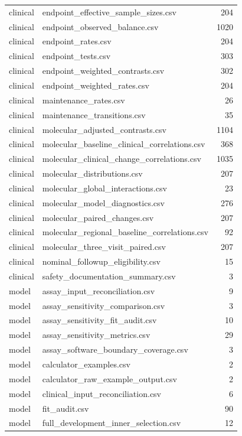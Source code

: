 \begin{longtable}{p{20mm}p{115mm}r}
clinical & endpoint\_effective\_sample\_sizes.csv & 204 \\
clinical & endpoint\_observed\_balance.csv & 1020 \\
clinical & endpoint\_rates.csv & 204 \\
clinical & endpoint\_tests.csv & 303 \\
clinical & endpoint\_weighted\_contrasts.csv & 302 \\
clinical & endpoint\_weighted\_rates.csv & 204 \\
clinical & maintenance\_rates.csv & 26 \\
clinical & maintenance\_transitions.csv & 35 \\
clinical & molecular\_adjusted\_contrasts.csv & 1104 \\
clinical & molecular\_baseline\_clinical\_correlations.csv & 368 \\
clinical & molecular\_clinical\_change\_correlations.csv & 1035 \\
clinical & molecular\_distributions.csv & 207 \\
clinical & molecular\_global\_interactions.csv & 23 \\
clinical & molecular\_model\_diagnostics.csv & 276 \\
clinical & molecular\_paired\_changes.csv & 207 \\
clinical & molecular\_regional\_baseline\_correlations.csv & 92 \\
clinical & molecular\_three\_visit\_paired.csv & 207 \\
clinical & nominal\_followup\_eligibility.csv & 15 \\
clinical & safety\_documentation\_summary.csv & 3 \\
model & assay\_input\_reconciliation.csv & 9 \\
model & assay\_sensitivity\_comparison.csv & 3 \\
model & assay\_sensitivity\_fit\_audit.csv & 10 \\
model & assay\_sensitivity\_metrics.csv & 29 \\
model & assay\_software\_boundary\_coverage.csv & 3 \\
model & calculator\_examples.csv & 2 \\
model & calculator\_raw\_example\_output.csv & 2 \\
model & clinical\_input\_reconciliation.csv & 6 \\
model & fit\_audit.csv & 90 \\
model & full\_development\_inner\_selection.csv & 12 \\

\end{longtable}
